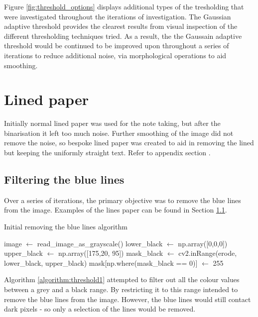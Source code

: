 Figure \ref{fig:threshold_options} displays additional types of the tresholding that were investigated throughout the iterations of investigation. The Gaussian adaptive threshold provides the clearest results from visual inspection of the different thresholding techniques tried. As a result, the the Gaussain adaptive threshold would be continued to be improved upon throughout a series of iterations to reduce additional noise, via morphological operations to aid smoothing.

\section{Lined paper}
Initially normal lined paper was used for the note taking, but after the binarisation it left too much noise. Further smoothing of the image did not remove the noise, so bespoke lined paper was created to aid in removing the lined but keeping the uniformly straight text. Refer to appendix \cite{appendix:image_processing} section \cite{processing:pre-line}.

\subsection{Filtering the blue lines}
Over a series of iterations, the primary objective was to remove the blue lines from the image. Examples of the lines paper can be found in Section \ref{}.

\begin{algorithm}
\caption{Initial removing the blue lines algorithm}
\label{algorithm:threshold1}
\begin{algorithmic}[1]
    \State image $\gets$ read\_image\_as\_grayscale()
    \State lower\_black $\gets$ np.array([0,0,0])
    \State upper\_black $\gets$ np.array([175,20, 95])
    \State mask\_black $\gets$ cv2.inRange(erode, lower\_black, upper\_black)
    \State mask[np.where(mask\_black == 0)] $\gets$ 255
  \EndFunction
  \end{algorithmic}
\end{algorithm}

Algorithm \ref{algorithm:threshold1} attempted to filter out all the colour values between a grey and a black range. By restricting it to this range intended to remove the blue lines from the image. However, the blue lines would still contact dark pixels - so only a selection of the lines would be removed.

